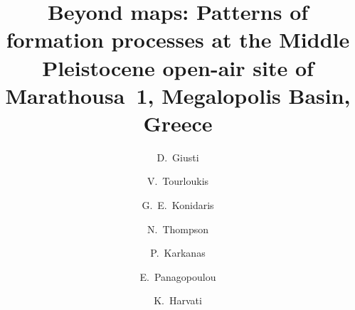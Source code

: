 \documentclass[review,authoryear,times]{elsarticle} %
\begin{document}
\begin{frontmatter}
  
  \title{Beyond maps: Patterns of formation processes at the Middle Pleistocene open-air site of Marathousa~1, Megalopolis Basin, Greece}
  
  \author[tue]{D.~Giusti}
  
  \author[tue]{V.~Tourloukis}
  \author[tue]{G.~E.~Konidaris}
  \author[erlangen]{N.~Thompson}
  \author[wiener]{P.~Karkanas}
  \author[ephoreia]{E.~Panagopoulou}
  \author[tue]{K.~Harvati}
  
  \address[tue]{Paläoanthropologie, Senckenberg Centre for Human Evolution and Palaeoenvironment, Eberhard Karls Universität Tübingen, Rümelinstr. 23, 72070 Tübingen, Germany}
  \address[erlangen]{Friedrich-Alexander University of Erlangen-Nürnberg, Institute of Prehistory and Early History, Kochstr. 4/18, 90154 Erlangen, Germany}
  \address[wiener]{Malcolm H. Wiener Laboratory for Archaeological Science, American School of Classical Studies at Athens, Greece}
  \address[ephoreia]{Ephoreia of Palaeoanthropology-Speleology of Greece, Athens, Greece}


\end{frontmatter}
\end{document}
